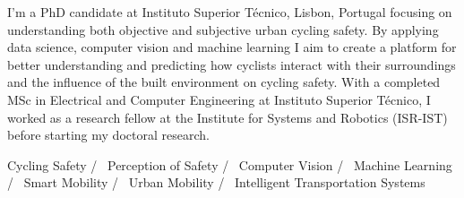 

\begin{cvparagraph}

I'm a PhD candidate at Instituto Superior Técnico, Lisbon, Portugal focusing on understanding both objective and subjective urban cycling safety. By applying data science, computer vision and machine learning I aim to create a platform for better understanding and predicting how cyclists interact with their surroundings and the influence of the built environment on cycling safety. With a completed MSc in Electrical and Computer Engineering at Instituto Superior Técnico, I worked as a research fellow at the Institute for Systems and Robotics (ISR-IST) before starting my doctoral research.
\end{cvparagraph}
\vspace{-1.ex}\begin{cvtechnologies}
 Cycling Safety /~
 Perception of Safety /~
 Computer Vision /~
 Machine Learning /~
 Smart Mobility /~
 Urban Mobility /~
 Intelligent Transportation Systems ~
\end{cvtechnologies}
